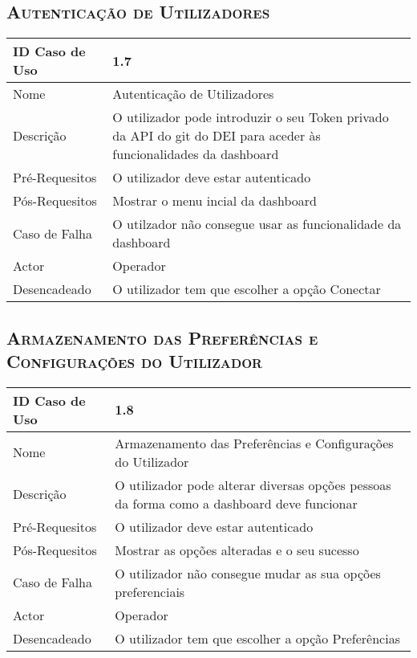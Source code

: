 \documentclass[12pt]{article}
\begin{document}
\subsection{ \textsc{Autenticação de Utilizadores}}

\begin{center}
\begin{tabular}{ | m{4cm} | m{10cm} | } 
\hline
ID Caso de Uso & 1.7\\
\hline
Nome & Autenticação de Utilizadores\\
\hline
Descrição & O utilizador pode introduzir o seu Token privado da API do git do DEI para aceder às funcionalidades da dashboard\\
\hline
Pré-Requesitos & O utilizador deve estar autenticado\\
\hline
Pós-Requesitos & Mostrar o menu incial da dashboard\\
\hline
Caso de Falha & O utilzador não consegue usar as funcionalidade da dashboard\\
\hline
Actor & Operador\\
\hline
Desencadeado & O utilizador tem que escolher a opção Conectar\\
\hline
\end{tabular}
\end{center}


\subsection{ \textsc{Armazenamento das Preferências e Configurações do Utilizador}}

\begin{center}
\begin{tabular}{ | m{4cm} | m{10cm} | } 
\hline
ID Caso de Uso & 1.8\\
\hline
Nome & Armazenamento das Preferências e Configurações do Utilizador\\
\hline
Descrição & O utilizador pode alterar diversas opções pessoas da forma como a dashboard deve funcionar\\
\hline
Pré-Requesitos & O utilizador deve estar autenticado\\
\hline
Pós-Requesitos & Mostrar as opções alteradas e o seu sucesso\\
\hline
Caso de Falha & O utilizador não consegue mudar as sua opções preferenciais\\
\hline
Actor & Operador\\
\hline
Desencadeado & O utilizador tem que escolher a opção Preferências\\
\hline
\end{tabular}
\end{center}
\end{document}
